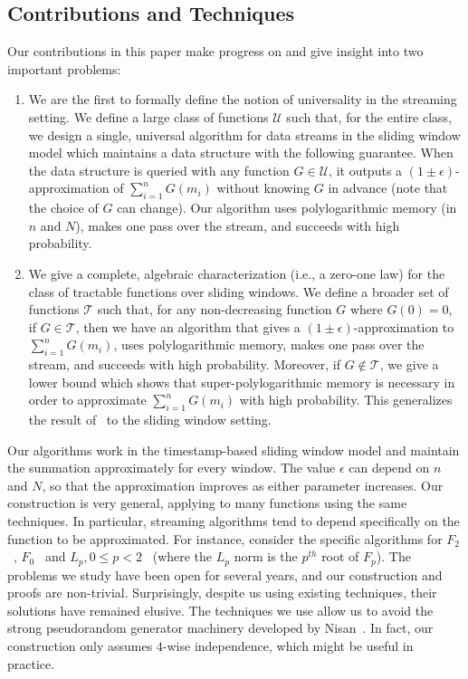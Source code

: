 \documentclass[11pt]{article}
\begin{document}
\subsection{Contributions and Techniques}
Our contributions in this paper make progress on and give insight into two important problems:
\begin{enumerate}[itemsep=0mm]
\item We are the first to formally define the notion of universality in the streaming setting.  We define
a large class of functions $\mathcal{U}$ such that, for the entire class, we design a single, universal algorithm
for data streams in the sliding window model which maintains a data structure with the following guarantee.
When the data structure is queried with any function $G \in \mathcal{U}$, it outputs a
$(1 \pm \epsilon)$-approximation of $\sum_{i=1}^nG(m_i)$ without knowing $G$ in advance (note
that the choice of $G$ can change).  Our algorithm uses polylogarithmic memory (in $n$ and $N$), makes one
pass over the stream, and succeeds with high probability.

\item We give a complete, algebraic characterization (i.e., a zero-one law) for the class of tractable functions over
sliding windows.  We define a broader set of functions $\mathcal{T}$
such that, for any non-decreasing function $G$ where $G(0) = 0$, if $G \in \mathcal{T}$, then we have an algorithm that gives
a $(1 \pm \epsilon)$-approximation to $\sum_{i=1}^n G(m_i)$, uses polylogarithmic memory, makes one pass
over the stream, and succeeds with high probability.  Moreover, if $G \not\in \mathcal{T}$,
we give a lower bound which shows that super-polylogarithmic memory is necessary in order to approximate
$\sum_{i=1}^nG(m_i)$ with high probability.  This generalizes the result of~\cite{BO10}
to the sliding window setting.
\end{enumerate}

Our algorithms work in the timestamp-based sliding window model and maintain the summation approximately for every window.
The value $\epsilon$ can depend on $n$ and $N$, so that
the approximation improves as either parameter increases. Our construction
is very general, applying to many functions using the same techniques.
In particular, streaming algorithms tend to depend specifically on the function
to be approximated.  For instance, consider the specific algorithms for $F_2$~\cite{AMS96, I06},
$F_0$~\cite{FM85, CDIM03, AMS96} and $L_p, 0\le p<2$~\cite{I06, L09, KNW10Soda} (where the $L_p$
norm is the $p^{th}$ root of $F_p$).  The problems we study have been open
for several years, and our construction and proofs are
non-trivial.  Surprisingly, despite us using existing techniques, their solutions have remained
elusive.  The techniques we use allow us to avoid the strong pseudorandom
generator machinery developed by Nisan~\cite{N90}.  In fact, our construction only assumes
$4$-wise independence, which might be useful in practice.
\end{document}
